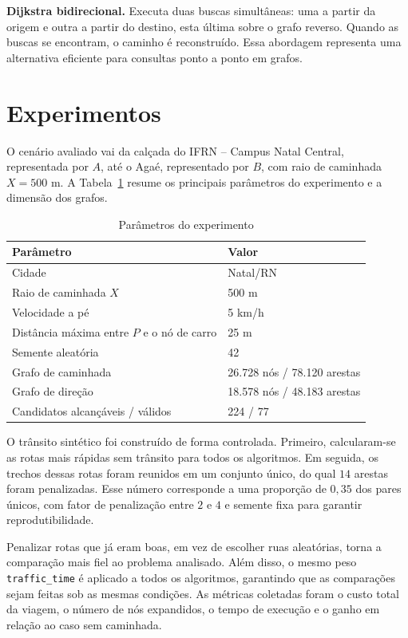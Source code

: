 \documentclass[conference]{IEEEtran}
\begin{document}
\textbf{Dijkstra bidirecional.} Executa duas buscas simultâneas: uma a partir da origem e outra a partir do destino, esta última sobre o grafo reverso. Quando as buscas se encontram, o caminho é reconstruído. Essa abordagem representa uma alternativa eficiente para consultas ponto a ponto em grafos.

\section{Experimentos}
O cenário avaliado vai da calçada do IFRN -- Campus Natal Central, representada por $A$, até o Agaé, representado por $B$, com raio de caminhada $X = 500$ m. A Tabela~\ref{tab:parametros} resume os principais parâmetros do experimento e a dimensão dos grafos.

\begin{table}[H] \centering \caption{Parâmetros do experimento} \label{tab:parametros} \footnotesize \begin{tabular}{@{}ll@{}} \toprule Parâmetro & Valor \\ \midrule Cidade & Natal/RN \\ Raio de caminhada $X$ & 500 m \\ Velocidade a pé & 5 km/h \\ Distância máxima entre $P$ e o nó de carro & 25 m \\ Semente aleatória & 42 \\ Grafo de caminhada & 26.728 nós / 78.120 arestas \\ Grafo de direção & 18.578 nós / 48.183 arestas \\ Candidatos alcançáveis / válidos & 224 / 77 \\ \bottomrule \end{tabular} \end{table}

O trânsito sintético foi construído de forma controlada. Primeiro, calcularam-se as rotas mais rápidas sem trânsito para todos os algoritmos. Em seguida, os trechos dessas rotas foram reunidos em um conjunto único, do qual $14$ arestas foram penalizadas. Esse número corresponde a uma proporção de $0{,}35$ dos pares únicos, com fator de penalização entre $2$ e $4$ e semente fixa para garantir reprodutibilidade.

Penalizar rotas que já eram boas, em vez de escolher ruas aleatórias, torna a comparação mais fiel ao problema analisado. Além disso, o mesmo peso \texttt{traffic\_time} é aplicado a todos os algoritmos, garantindo que as comparações sejam feitas sob as mesmas condições. As métricas coletadas foram o custo total da viagem, o número de nós expandidos, o tempo de execução e o ganho em relação ao caso sem caminhada.
\end{document}
